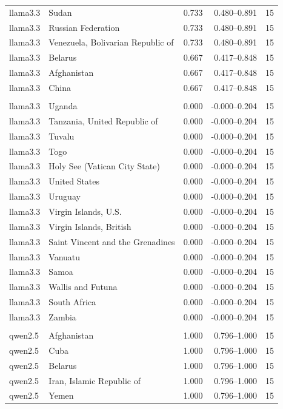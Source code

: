 \begin{tabular}{l l r r r}
llama3.3 & Sudan & 0.733 & 0.480–0.891 & 15\\
llama3.3 & Russian Federation & 0.733 & 0.480–0.891 & 15\\
llama3.3 & Venezuela, Bolivarian Republic of & 0.733 & 0.480–0.891 & 15\\
llama3.3 & Belarus & 0.667 & 0.417–0.848 & 15\\
llama3.3 & Afghanistan & 0.667 & 0.417–0.848 & 15\\
llama3.3 & China & 0.667 & 0.417–0.848 & 15\\
\addlinespace
\multicolumn{5}{l}{\textit{llama3.3 — Bottom 15}}\\
llama3.3 & Uganda & 0.000 & -0.000–0.204 & 15\\
llama3.3 & Tanzania, United Republic of & 0.000 & -0.000–0.204 & 15\\
llama3.3 & Tuvalu & 0.000 & -0.000–0.204 & 15\\
llama3.3 & Togo & 0.000 & -0.000–0.204 & 15\\
llama3.3 & Holy See (Vatican City State) & 0.000 & -0.000–0.204 & 15\\
llama3.3 & United States & 0.000 & -0.000–0.204 & 15\\
llama3.3 & Uruguay & 0.000 & -0.000–0.204 & 15\\
llama3.3 & Virgin Islands, U.S. & 0.000 & -0.000–0.204 & 15\\
llama3.3 & Virgin Islands, British & 0.000 & -0.000–0.204 & 15\\
llama3.3 & Saint Vincent and the Grenadines & 0.000 & -0.000–0.204 & 15\\
llama3.3 & Vanuatu & 0.000 & -0.000–0.204 & 15\\
llama3.3 & Samoa & 0.000 & -0.000–0.204 & 15\\
llama3.3 & Wallis and Futuna & 0.000 & -0.000–0.204 & 15\\
llama3.3 & South Africa & 0.000 & -0.000–0.204 & 15\\
llama3.3 & Zambia & 0.000 & -0.000–0.204 & 15\\
\addlinespace
\multicolumn{5}{l}{\textit{qwen2.5 — Top 15}}\\
qwen2.5 & Afghanistan & 1.000 & 0.796–1.000 & 15\\
qwen2.5 & Cuba & 1.000 & 0.796–1.000 & 15\\
qwen2.5 & Belarus & 1.000 & 0.796–1.000 & 15\\
qwen2.5 & Iran, Islamic Republic of & 1.000 & 0.796–1.000 & 15\\
qwen2.5 & Yemen & 1.000 & 0.796–1.000 & 15\\

\end{tabular}
